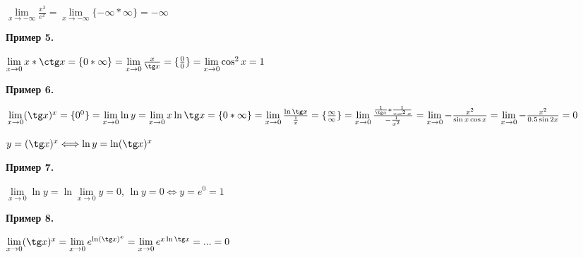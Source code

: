 \documentclass{article}
\begin{document}
\begin{flushleft}
$\lim\limits_{x \to -\infty} \frac{x^3}{e^x} =  \lim\limits_{x \to -\infty} \{ -\infty * \infty \} = -\infty$

\hfill

\textbf{Пример 5.}

$\lim\limits_{x \to 0} x * \ctg x = \{ 0 * \infty \} = \lim\limits_{x \to 0} \frac{x}{\tg x} = \{ \frac{0}{0} \} = \lim\limits_{x \to 0} \cos^2{x} = 1$

\hfill

\textbf{Пример 6.}

$\lim\limits_{x \to 0} (\tg x)^x = \{ 0^0 \} = \lim\limits_{x \to 0} \ln y = \lim\limits_{x \to 0} x \ln \tg x = \{ 0 * \infty \} = \lim\limits_{x \to 0} \frac{\ln \tg x}{\frac{1}{x}} = \{ \frac{\infty}{\infty} \} = \lim\limits_{x \to 0} \frac{\frac{1}{\tg x} * \frac{1}{\cos^2 x}}{-\frac{1}{x^2}} = \lim\limits_{x \to 0} - \frac{x^2}{\sin x \cos x} = \lim\limits_{x \to 0} -\frac{x^2}{0.5\sin 2x} = 0$

$y = (\tg x)^x \Longleftrightarrow \ln y = \ln (\tg x)^x$

\hfill

\textbf{Пример 7.}

$\lim\limits_{x \to 0} \ln y = \ln \lim\limits_{x \to 0} y = 0$,  $\ln y = 0 \Longleftrightarrow y = e^0 = 1$

\hfill

\textbf{Пример 8.}

$\lim\limits_{x \to 0} (\tg x)^x = \lim\limits_{x \to 0} e^{\ln(\tg x)^x} = \lim\limits_{x \to 0} e^{x \ln \tg x} = ... = 0$

\end{flushleft}
\end{document}
